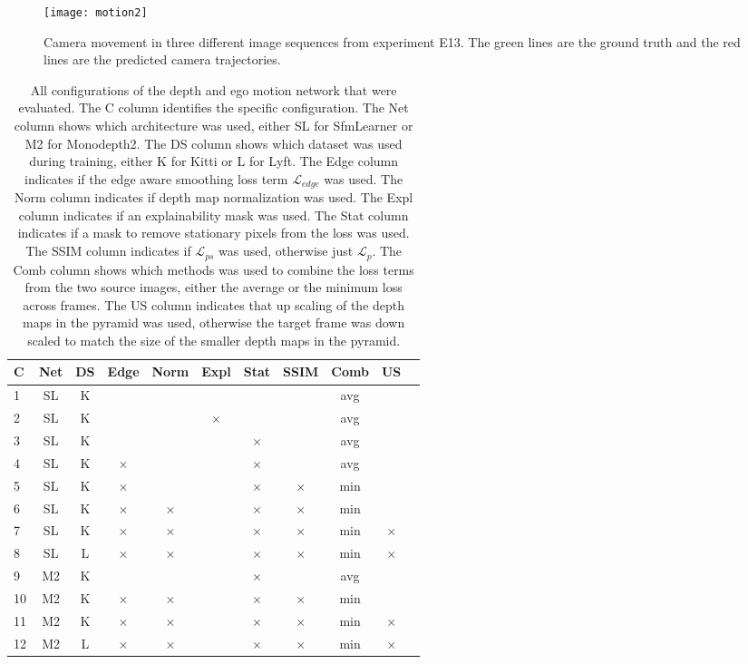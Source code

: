 \begin{figure}[H]
	\centering
	\texttt{[image: motion2]}
	\caption{Camera movement in three different image sequences from experiment E13. The green lines are the ground truth and the red lines are the predicted camera trajectories.}
	\label{fig:movement}
\end{figure}

\begin{table}[H]
\centering
\begin{tabular}{|l|c|c||c|c||c|c||c|c|c|c|}
\hline
C & Net & DS & Edge & Norm & Expl & Stat & SSIM & Comb & US \\
\hline
1 & SL & K &  &  &  &  &  & avg &  \\
\hline
2 & SL & K &  &  & $ \times $ &  &  & avg &  \\
\hline
3 & SL & K &  &  &  & $ \times $ &  & avg &  \\
\hline
4 & SL & K & $ \times $ &  &  & $ \times $ &  & avg &  \\
\hline
5 & SL & K & $ \times $ &  &  & $ \times $ & $ \times $ & min &  \\
\hline
6 & SL & K & $ \times $ & $ \times $ &  & $ \times $ & $ \times $ & min &  \\
\hline
7 & SL & K & $ \times $ & $ \times $ &  & $ \times $ & $ \times $ & min & $ \times $ \\
\hline
8 & SL & L & $ \times $ & $ \times $ &  & $ \times $ & $ \times $ & min & $ \times $ \\
\hline
9 & M2 & K &  &  &  & $ \times $ &  & avg &  \\
\hline
10 & M2 & K & $ \times $ & $ \times $ &  & $ \times $ & $ \times $ & min &  \\
\hline
11 & M2 & K & $ \times $ & $ \times $ &  & $ \times $ & $ \times $ & min & $ \times $ \\
\hline
12 & M2 & L & $ \times $ & $ \times $ &  & $ \times $ & $ \times $ & min & $ \times $ \\
\hline
\end{tabular}
\caption{All configurations of the depth and ego motion network that were evaluated. The C column identifies the specific configuration. The Net column shows which architecture was used, either SL for SfmLearner or M2 for Monodepth2. The DS column shows which dataset was used during training, either K for Kitti or L for Lyft. The Edge column indicates if the edge aware smoothing loss term $\mathcal{L}_{edge}$ was used. The Norm column indicates if depth map normalization was used. The Expl column indicates if an explainability mask was used. The Stat column indicates if a mask to remove stationary pixels from the loss was used. The SSIM column indicates if $\mathcal{L}_{ps}$ was used, otherwise just $\mathcal{L}_{p}$. The Comb column shows which methods was used to combine the loss terms from the two source images, either the average or the minimum loss across frames. The US column indicates that up scaling of the depth maps in the pyramid was used, otherwise the target frame was down scaled to match the size of the smaller depth maps in the pyramid.}
\label{table:configurations}
\end{table}


